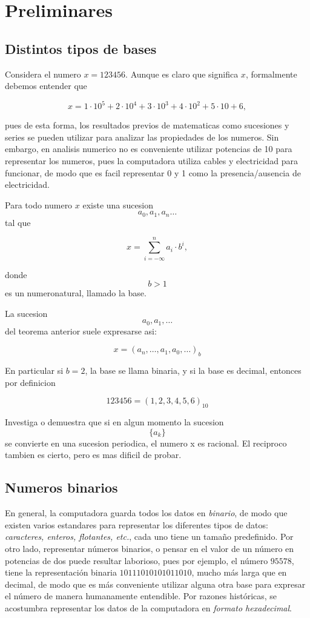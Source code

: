\section{Preliminares}

\subsection{Distintos tipos de bases}

Considera el numero $x = 123456$. Aunque es claro que significa $x$, formalmente debemos entender que 

\[x = 1 \cdot 10^5 + 2 \cdot 10^4 + 3 \cdot 10^3 + 4 \cdot 10^2 + 5 \cdot 10 + 6,\]

pues de esta forma, los resultados previos de matematicas como sucesiones y series se pueden utilizar para analizar las propiedades de los numeros. Sin embargo, en analisis numerico no es conveniente utilizar potencias de 10 para representar los numeros, pues la computadora utiliza cables y electricidad para funcionar, de modo que es facil representar 0 y  1 como la presencia/ausencia de electricidad.

\begin{theorem}
Para todo numero $x$ existe una sucesion \[a_0, a_1, a_n\ldots\] tal que 

\[x = \sum_{i = -\infty}^n a_i\cdot b^i,\]

donde \[b > 1 \] es un numeronatural, llamado la base.  
\end{theorem}

La sucesion \[a_0, a_1, \ldots\] del teorema anterior suele expresarse asi:

\[x = (a_n, \ldots, a_1, a_0, \ldots)_b\]

En particular si $b = 2$, la base se llama binaria, y si la base es decimal, entonces por definicion

\[123456 = (1, 2, 3, 4, 5, 6)_{10}\]

\begin{exercise}
Investiga o demuestra que si en algun momento la sucesion \[\{a_k\}\] se convierte en una sucesion periodica, el numero x es racional. El reciproco tambien es cierto, pero es mas dificil de probar.
\end{exercise}

\subsection{Numeros binarios}
En general, la computadora guarda todos los datos en \emph{binario}, de modo que existen varios estandares para representar los diferentes tipos de datos: \emph{caracteres, enteros, flotantes, etc.}, cada uno tiene un tamaño predefinido. Por otro lado, representar números binarios, o pensar en el valor de un número en potencias de dos puede resultar laborioso, pues por ejemplo, el número $95578$, tiene la representación binaria $10111010101011010$, mucho más larga que en decimal, de modo que es más conveniente utilizar alguna otra base para expresar el número de manera humanamente entendible. Por razones históricas, se acostumbra representar los datos de la computadora en \emph{formato hexadecimal}.

